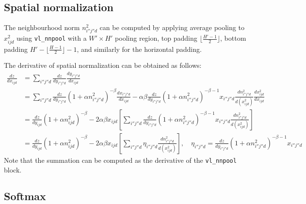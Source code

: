 \subsection{Spatial normalization}\label{s:impl-spnorm}

The neighbourhood norm $n^2_{i''j''d}$ can be computed by applying average pooling to $x_{ijd}^2$ using \verb!vl_nnpool! with a $W'\times H'$ pooling region, top padding $\lfloor \frac{H'-1}{2}\rfloor$, bottom padding $H'-\lfloor \frac{H-1}{2}\rfloor-1$, and similarly for the horizontal padding.

The derivative of spatial normalization can be obtained as follows:
\begin{align*}
\frac{dz}{dx_{ijd}} 
&= \sum_{i''j''d}
\frac{dz}{d y_{i''j''d}} 
\frac{d y_{i''j''d}}{d x_{ijd}}
\\
&=
\sum_{i''j''d}
\frac{dz}{d y_{i''j''d}} 
(1 + \alpha n_{i''j''d}^2)^{-\beta}
\frac{dx_{i''j''d}}{d x_{ijd}} 
-\alpha\beta
\frac{dz}{d y_{i''j''d}} 
(1 + \alpha n_{i''j''d}^2)^{-\beta-1}
x_{i''j''d}
\frac{dn_{i''j''d}^2}{d (x^2_{ijd})} 
\frac{dx^2_{ijd}}{d x_{ijd}}
\\
&=
\frac{dz}{d y_{ijd}} 
(1 + \alpha n_{ijd}^2)^{-\beta}
-2\alpha\beta x_{ijd}
\left[
\sum_{i''j''d}
\frac{dz}{d y_{i''j''d}} 
(1 + \alpha n_{i''j''d}^2)^{-\beta-1}
x_{i''j''d}
\frac{dn_{i''j''d}^2}{d (x_{ijd}^2)}
\right]
\\
&=
\frac{dz}{d y_{ijd}} 
(1 + \alpha n_{ijd}^2)^{-\beta}
-2\alpha\beta x_{ijd}
\left[
\sum_{i''j''d}
\eta_{i''j''d}
\frac{dn_{i''j''d}^2}{d (x_{ijd}^2)}
\right],
\quad
\eta_{i''j''d}=
\frac{dz}{d y_{i''j''d}} 
(1 + \alpha n_{i''j''d}^2)^{-\beta-1}
x_{i''j''d}
\end{align*}
Note that the summation can be computed as the derivative of the
\verb!vl_nnpool! block.

\subsection{Softmax}\label{s:impl-softmax}

